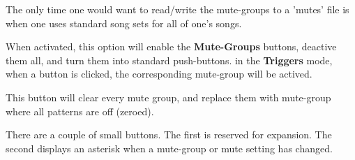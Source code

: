    The only time one would want to read/write the mute-groups to a 'mutes' file
   is when one uses standard song sets for all of one's songs.

      When activated, this option will enable the \textbf{Mute-Groups} buttons,
      deactive them all, and turn them into standard push-buttons.
      in the \textbf{Triggers} mode, when a button is clicked,
      the corresponding mute-group will be actived.

      This button will clear every mute group, and replace them with
      mute-group where all patterns are off (zeroed).

      There are a couple of small buttons.
      The first is reserved for expansion.
      The second displays an asterisk when a mute-group or mute setting
      has changed.


%

